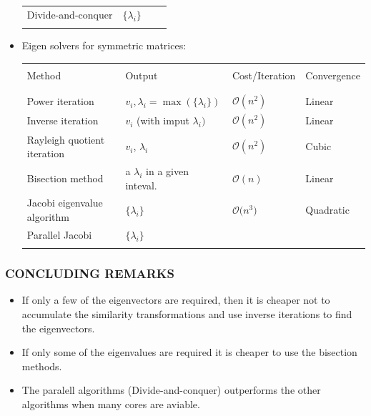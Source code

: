 \documentclass[a4paper,8pt]{beamer} %
\begin{document}
\begin{frame}
\begin{itemize}
\begin{table}
\begin{Tiny}
\begin{tabular}{llll}
							Divide-and-conquer 			& $\{\lambda_i\}$ 	&  & \\
							\\
							\hline
							\hline
						\end{tabular}
					\end{Tiny}
				\end{table}
			\item Eigen solvers for symmetric matrices:
				\begin{table}
					\begin{Tiny}
						\centering
						\begin{tabular}{llll}
							\hline
							\hline
							\\
							Method & Output & Cost/Iteration & Convergence \\
							\\
							\hline
							\\
							Power iteration 			& $v_i, \lambda_{i}=\max{(\{\lambda_i\})}$ & $\mathcal O(n^{2})$& Linear\\ 
							Inverse iteration 			& $v_i$ (with imput $\lambda_{i})$ & $\mathcal O(n^2)$ & Linear\\ 
							Rayleigh quotient iteration & $v_i$, $\lambda_{i}$ & $\mathcal O(n^2)$ &	Cubic \\
							Bisection method 		& a $\lambda_i$ in a given inteval.	& $\mathcal O(n)$ & Linear \\
							Jacobi eigenvalue algorithm	& $\{\lambda_i\}$ 	& $\mathcal O\mathcal(n^3)$ & Quadratic \\
							Parallel Jacobi& $\{\lambda_i\}$ &  & \\
							\\
							\hline
							\hline
						\end{tabular}
					\end{Tiny}
				\end{table}
		\end{itemize}
\end{frame}%

\begin{frame}%
\frametitle{CONCLUDING REMARKS}
	\begin{itemize}
		\item If only a few of the eigenvectors are required, then it is cheaper not to accumulate the similarity 
			transformations and use inverse iterations to find the eigenvectors. 
		\item If only some of the eigenvalues are required it is cheaper to use the bisection methods.
		\item The paralell algorithms (Divide-and-conquer) outperforms the other algorithms when many cores are 
			aviable.
	\end{itemize}
\end{frame}%
\end{document}
